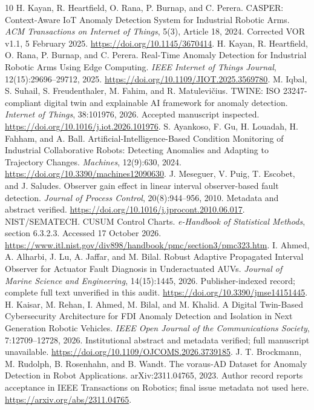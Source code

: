 \begin{thebibliography}{10}
 H. Kayan, R. Heartfield, O. Rana, P. Burnap, and C. Perera. CASPER: Context-Aware IoT Anomaly Detection System for Industrial Robotic Arms. \emph{ACM Transactions on Internet of Things}, 5(3), Article 18, 2024. Corrected VOR v1.1, 5 February 2025. \url{https://doi.org/10.1145/3670414}.
 H. Kayan, R. Heartfield, O. Rana, P. Burnap, and C. Perera. Real-Time Anomaly Detection for Industrial Robotic Arms Using Edge Computing. \emph{IEEE Internet of Things Journal}, 12(15):29696--29712, 2025. \url{https://doi.org/10.1109/JIOT.2025.3569780}.
 M. Iqbal, S. Suhail, S. Freudenthaler, M. Fahim, and R. Matulevičius. TWINE: ISO 23247-compliant digital twin and explainable AI framework for anomaly detection. \emph{Internet of Things}, 38:101976, 2026. Accepted manuscript inspected. \url{https://doi.org/10.1016/j.iot.2026.101976}.
 S. Ayankoso, F. Gu, H. Louadah, H. Fahham, and A. Ball. Artificial-Intelligence-Based Condition Monitoring of Industrial Collaborative Robots: Detecting Anomalies and Adapting to Trajectory Changes. \emph{Machines}, 12(9):630, 2024. \url{https://doi.org/10.3390/machines12090630}.
 J. Meseguer, V. Puig, T. Escobet, and J. Saludes. Observer gain effect in linear interval observer-based fault detection. \emph{Journal of Process Control}, 20(8):944--956, 2010. Metadata and abstract verified. \url{https://doi.org/10.1016/j.jprocont.2010.06.017}.
 NIST/SEMATECH. CUSUM Control Charts. \emph{e-Handbook of Statistical Methods}, section 6.3.2.3. Accessed 17 October 2026. \url{https://www.itl.nist.gov/div898/handbook/pmc/section3/pmc323.htm}.
 I. Ahmed, A. Alharbi, J. Lu, A. Jaffar, and M. Bilal. Robust Adaptive Propagated Interval Observer for Actuator Fault Diagnosis in Underactuated AUVs. \emph{Journal of Marine Science and Engineering}, 14(15):1445, 2026. Publisher-indexed record; complete full text unverified in this audit. \url{https://doi.org/10.3390/jmse14151445}.
 H. Kaisar, M. Rehan, I. Ahmed, M. Bilal, and M. Khalid. A Digital Twin-Based Cybersecurity Architecture for FDI Anomaly Detection and Isolation in Next Generation Robotic Vehicles. \emph{IEEE Open Journal of the Communications Society}, 7:12709--12728, 2026. Institutional abstract and metadata verified; full manuscript unavailable. \url{https://doi.org/10.1109/OJCOMS.2026.3739185}.
 J. T. Brockmann, M. Rudolph, B. Rosenhahn, and B. Wandt. The voraus-AD Dataset for Anomaly Detection in Robot Applications. arXiv:2311.04765, 2023. Author record reports acceptance in IEEE Transactions on Robotics; final issue metadata not used here. \url{https://arxiv.org/abs/2311.04765}.
\end{thebibliography}
